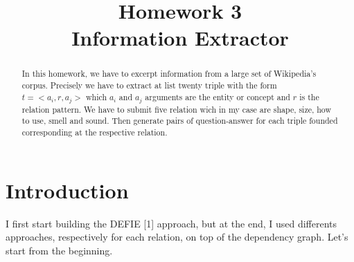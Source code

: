 \documentclass[conference,compsoc]{IEEEtran}
\begin{document}
%
\title{Homework 3  \\ Information Extractor}


\author{
}






\maketitle

\begin{abstract}
In this homework, we have to excerpt information from a large set of Wikipedia's corpus. Precisely we have to extract at list twenty triple with the form $t=<a_{i}, r , a_{j}>$ which $a_{i} $ and $a_{j}$ arguments are the entity or concept and $r $ is the relation pattern. We have to submit five relation wich in my case are shape, size, how to use, smell and sound.  Then generate pairs of question-answer for each triple founded corresponding at the respective relation.
\end{abstract}
\IEEEpeerreviewmaketitle

\section{Introduction}
I first start building the DEFIE [1] approach, but at the end, I used differents approaches, respectively for each relation,  on top of the dependency graph. Let's start from the beginning. 
\end{document}
